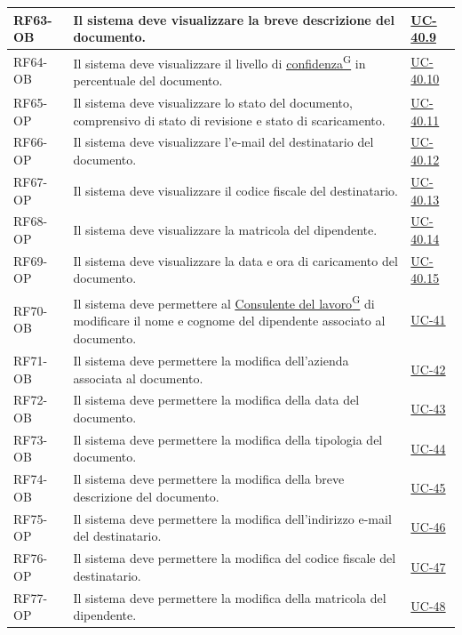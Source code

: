 ﻿\documentclass[a4paper,12pt]{article}
\providecommand{\glslink}[2]{\href{https://alittlebyte-19.github.io/Documentazione/glossario.html\#gls-#1}{\underline{#2}\textsuperscript{\scriptsize G}}}
\begin{document}
\begin{description}[style=multiline, leftmargin=4cm, font=\bfseries]
\begin{enumerate}[leftmargin=*, nosep]
{\begin{longtable}{|p{2.5cm}|p{9.5cm}|p{3.5cm}|}
    \hline
    RF63-OB & Il sistema deve visualizzare la breve descrizione del documento. & \hyperref[fig:uc-40.9]{UC-40.9} \\
    \hline
    RF64-OB & Il sistema deve visualizzare il livello di \glslink{confidenza-confidence-score}{confidenza} in percentuale del documento. & \hyperref[fig:uc-40.10]{UC-40.10} \\
   \hline
    RF65-OP & Il sistema deve visualizzare lo stato del documento, comprensivo di stato di revisione e stato di scaricamento. & \hyperref[fig:uc-40.11]{UC-40.11} \\
    \hline
    RF66-OP & Il sistema deve visualizzare l'e-mail del destinatario del documento. & \hyperref[fig:uc-40.12]{UC-40.12} \\
    \hline
    RF67-OP & Il sistema deve visualizzare il codice fiscale del destinatario. & \hyperref[fig:uc-40.13]{UC-40.13} \\
    \hline
    RF68-OP & Il sistema deve visualizzare la matricola del dipendente. & \hyperref[fig:uc-40.14]{UC-40.14} \\
    \hline
    RF69-OP & Il sistema deve visualizzare la data e ora di caricamento del documento. & \hyperref[fig:uc-40.15]{UC-40.15} \\
    \hline
    RF70-OB & Il sistema deve permettere al \glslink{consulente-del-lavoro-cdl}{Consulente del lavoro} di modificare il nome e cognome del dipendente associato al documento. & \hyperref[fig:uc-41]{UC-41} \\
    \hline
    RF71-OB & Il sistema deve permettere la modifica dell'azienda associata al documento. & \hyperref[fig:uc-42]{UC-42} \\
    \hline
    RF72-OB & Il sistema deve permettere la modifica della data del documento. & \hyperref[fig:uc-43]{UC-43} \\
    \hline
    RF73-OB & Il sistema deve permettere la modifica della tipologia del documento. & \hyperref[fig:uc-44]{UC-44} \\
    \hline
    RF74-OB & Il sistema deve permettere la modifica della breve descrizione del documento. & \hyperref[fig:uc-45]{UC-45} \\
    \hline
    RF75-OP & Il sistema deve permettere la modifica dell'indirizzo e-mail del destinatario. & \hyperref[fig:uc-46]{UC-46} \\
    \hline
    RF76-OP & Il sistema deve permettere la modifica del codice fiscale del destinatario. & \hyperref[fig:uc-47]{UC-47} \\
    \hline
    RF77-OP & Il sistema deve permettere la modifica della matricola del dipendente. & \hyperref[fig:uc-48]{UC-48} \\

\end{longtable}}
\end{enumerate}
\end{description}
\end{document}
